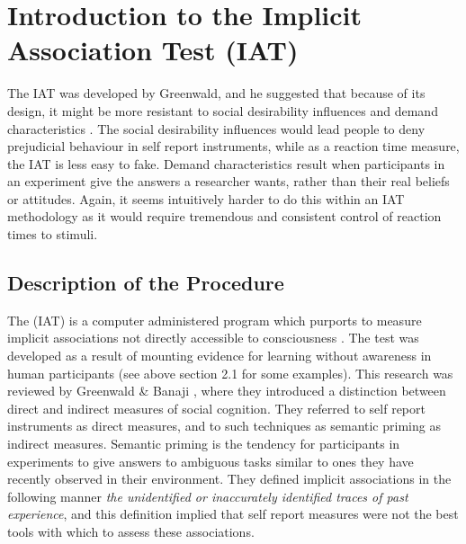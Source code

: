 \section{Introduction to the Implicit Association Test (IAT)}

The IAT was developed by Greenwald, and he suggested that because of its design, it might be more resistant to social desirability influences and demand characteristics \cite{Greenwald1998}. 
The social desirability influences would lead people to deny prejudicial behaviour in self report instruments, while as a reaction time measure, the IAT is less easy to fake. Demand characteristics result when participants in an experiment give the answers a researcher wants, rather than their real beliefs or attitudes. Again, it seems intuitively harder to do this within an IAT methodology as it would require tremendous and consistent control of reaction times to stimuli. 

\subsection{Description of the Procedure}

The (IAT) is a computer administered program which purports to measure implicit associations not directly accessible to consciousness \cite{Greenwald1998}. The test was developed as a result of mounting evidence for learning without awareness in human participants (see above section 2.1 for some examples). This research was reviewed by Greenwald \& Banaji \cite{Greenwald1995a}, where they introduced a distinction between direct and indirect measures of social cognition. They referred to self report instruments as direct measures, and to such techniques as semantic priming as indirect measures. Semantic priming is the tendency for participants in experiments to give answers to ambiguous tasks similar to ones they have recently observed in their environment.  They defined implicit associations in the following manner \textit{the unidentified or inaccurately identified traces of past experience}, and this definition implied that self report measures were not the best tools with which to assess these associations. 

